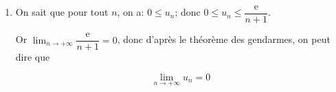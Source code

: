 \documentclass[10pt]{article}
\providecommand{\e}{{\mathrm{e}}}
\renewcommand{\d}{{\mathrm{d}}}
\providecommand{\ds}{\displaystyle}
\begin{document}
\begin{enumerate}
\begin{enumerate}
$\begin{aligned}[t]
0 \leqslant  x \leqslant 1 
 &\implies  1-x  \leqslant 1 
\implies   \e^{1-x} \leqslant \e \text{~~~~(croissance de la fonction exponentielle)}\\
 &\implies   x^n \e^{1-x} \leqslant x^n\times \e ~~~~(x^n\geqslant 0)\\
 &\implies   \ds\int_{0}^{1} x^n \e^{1-x} \d x \leqslant \ds\int_{0}^{1}   x^n\times \e \d x \text{~~~~(craoissance de l'intégration)}\\
 &\implies   \ds\int_{0}^{1} x^n \e^{1-x} \d x \leqslant \e \ds\int_{0}^{1} x^n \d x
\implies   u_n \leqslant \e \left [ \dfrac{x^{n+1}}{n+1} \right ]_{0}^{1}\\
 & \implies   u_n \leqslant \dfrac{\e}{n+1} \\
\end{aligned}$

\item On sait que pour tout $n$, on a: $0\leqslant u_n$; donc $0\leqslant u_n \leqslant \dfrac{\e}{n+1}$.

Or  $\displaystyle\lim_{n \to + \infty} \dfrac{\e}{n+1} = 0$, donc d'après le théorème des gendarmes, on peut dire que  

\[\boxed{\displaystyle\lim_{n \to + \infty} u_n = 0}\]
	\end{enumerate}
\end{enumerate}


\bigskip
\end{document}
